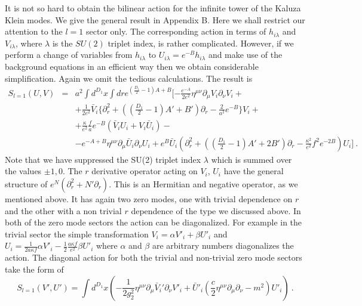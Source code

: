 \documentclass[a4paper,12pt]{article}
\begin{document}
It is not so hard to obtain the bilinear action for the infinite
tower of the Kaluza Klein modes. We give the general result in
Appendix B.  Here we shall restrict our attention to the $l=1$
sector only. The corresponding action in terms of $h_{i\lambda}$ and
$V_{i\lambda}$, where $\lambda$ is the $SU(2)$ triplet index,   is
rather complicated. However, if we  perform  a change of variables
from $h_{i\lambda}$ to $U_{i\lambda} = e^{-B} h_{i\lambda}$ and make
use of the background equations in an efficient way then we obtain
considerable simplification. Again we omit the tedious calculations.
The result is
\begin{eqnarray*}
S_{l=1}(U,V)&= &a^2\int d^{D_1}x\int dr
 e^{(\frac{D_1}{2}-1)A+B} [
 -\frac{e^{-A}}{2e^2}\eta^{\mu\nu}\partial_\mu V_i\partial_\nu V_i
 +\\
 &&+\frac{1}{2e^2}\bar V_i\{\partial^2_{r} +
 ((\frac{D_1}{2}-1)A' +B')\partial_r -
 \frac{2}{a^2}e^{-B}\}V_i +\\
 &&+\frac{\kappa}{e^2}\frac{f}{a}e^{-B}(\bar V_iU_i + V_i\bar U_i)
 -\\
 &&-e^{-A+B} \eta^{\mu\nu}\partial_\mu{\bar U}_i\partial_\nu U_i
 + e^B {\bar U}_i (\partial_{r}^2 + ((\frac{D_1}{2}-1)A'
 +2B')\partial_r
 -\frac{\kappa^2}{e^2}f^2 e^{-2B})U_i]~.
\end{eqnarray*}
Note that we have suppressed the SU(2) triplet index $\lambda$
which is summed over the values $\pm1, 0$. The $r$ derivative
operator acting on $V_i$, $U_i$ have the general structure of $e^N
(\partial_r ^2 +N'\partial_r)$. This is an Hermitian and negative
operator, as we mentioned above. It has again two zero modes, one
with trivial dependence on $r$ and the other with a non trivial $r$
dependence of the type we discussed above. In both of the  zero mode
sectors  the action can be diagonalized. For example in the trivial
sector the simple transformation $V_i= \alpha V'_{i} + \beta U'_i$
and $U_i = \frac{1}{2a\kappa f}\alpha V'{_i} -
\frac{1}{2}\frac{a\kappa f}{e^2}\beta U'{_i}$ where $\alpha$ and
$\beta$ are arbitrary numbers diagonalizes the action. The diagonal
action for both the trivial and non-trivial zero mode sectors take
the form of
\begin{equation}
S_{l=1}(V', U') =\int d^{D_1}x \left(-\frac{1}{2g_{2}
^2}\eta^{\mu\nu} \partial_\mu\bar V_i'\partial_\nu V'_i + \bar U'{_i}
( \frac{c}{2}\eta^{\mu\nu} \partial_\mu\partial_\nu -
m^2)U'_i\right)~.
\end{equation}
\end{document}
